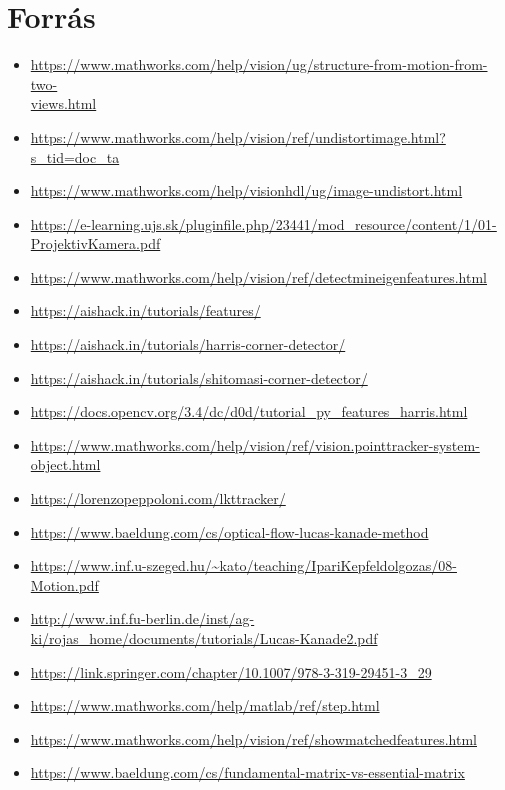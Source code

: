 \documentclass[12pt]{report}
\begin{document}
    \chapter{Forrás}
        \begin{itemize}
            \item \url{https://www.mathworks.com/help/vision/ug/structure-from-motion-from-two-}\\\url{views.html}
            \item \url{https://www.mathworks.com/help/vision/ref/undistortimage.html?s_tid=doc_ta}
            \item \url{https://www.mathworks.com/help/visionhdl/ug/image-undistort.html}
            \item \url{https://e-learning.ujs.sk/pluginfile.php/23441/mod_resource/content/1/01-ProjektivKamera.pdf}
            \item \url{https://www.mathworks.com/help/vision/ref/detectmineigenfeatures.html}
            \item \url{https://aishack.in/tutorials/features/}
            \item \url{https://aishack.in/tutorials/harris-corner-detector/}
            \item \url{https://aishack.in/tutorials/shitomasi-corner-detector/}
            \item \url{https://docs.opencv.org/3.4/dc/d0d/tutorial_py_features_harris.html}
            \item \url{https://www.mathworks.com/help/vision/ref/vision.pointtracker-system-object.html}
            \item \url{https://lorenzopeppoloni.com/lkttracker/}
            \item \url{https://www.baeldung.com/cs/optical-flow-lucas-kanade-method}
            \item \url{https://www.inf.u-szeged.hu/~kato/teaching/IpariKepfeldolgozas/08-Motion.pdf}
            \item \url{http://www.inf.fu-berlin.de/inst/ag-ki/rojas_home/documents/tutorials/Lucas-Kanade2.pdf}
            \item \url{https://link.springer.com/chapter/10.1007/978-3-319-29451-3_29}
            \item \url{https://www.mathworks.com/help/matlab/ref/step.html}
            \item \url{https://www.mathworks.com/help/vision/ref/showmatchedfeatures.html}
            \item \url{https://www.baeldung.com/cs/fundamental-matrix-vs-essential-matrix}

\end{itemize}
\end{document}
